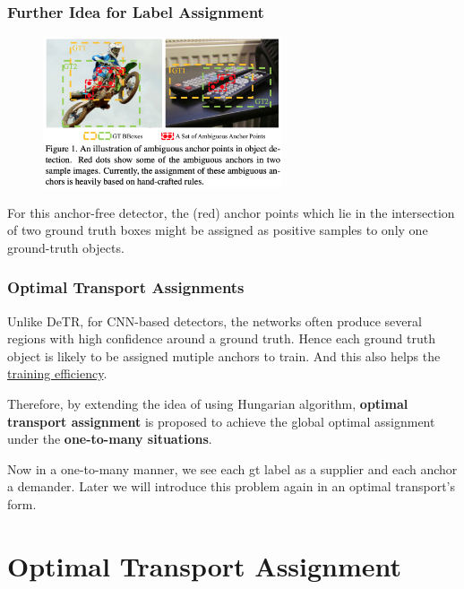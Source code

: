 \documentclass[slidetop, mathserif, dvipsnames]{beamer}
\begin{document}
\begin{frame}
    \frametitle{Further Idea for Label Assignment}

    \begin{figure}
    \includegraphics[width=200pt]{pics/ota_motivation.png}
    \end{figure}

    For this anchor-free detector, the (red) anchor points which lie in the
    intersection of two ground truth boxes might be assigned as positive
    samples to only one ground-truth objects.

\end{frame}

\begin{frame}
    \frametitle{Optimal Transport Assignments}

    Unlike DeTR, for CNN-based detectors, the networks often produce
    several regions with high confidence around a ground truth.
    Hence each ground truth object is likely to be assigned mutiple anchors
    to train. And this also helps the \underline{training efficiency}.

    \quad

    Therefore, by extending the idea of using Hungarian algorithm,
    {\bf optimal transport assignment} is proposed
    to achieve the global optimal assignment under
    the {\bf one-to-many situations}.

    \quad 

    Now in a one-to-many manner, we see each gt label as a supplier and each
    anchor a demander.
    Later we will introduce this problem again in an optimal transport's form.

\end{frame}


\section{Optimal Transport Assignment}
\end{document}

